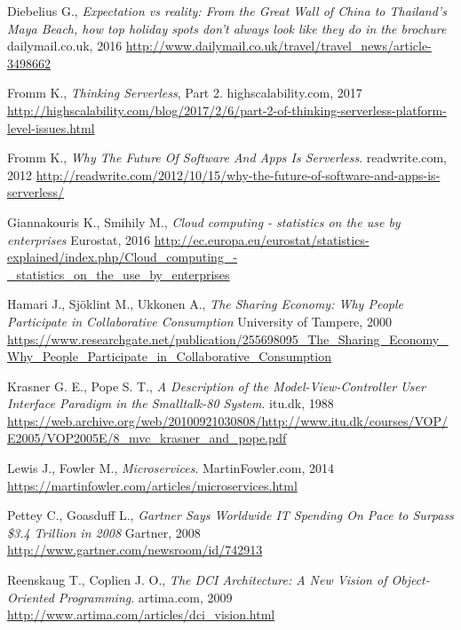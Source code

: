 \documentclass[oneside]{mgr}
\begin{document}
\begin{thebibliography}{99}

	Diebelius G., \emph{Expectation vs reality: From the Great Wall of China to Thailand's Maya Beach, how top holiday spots don't always look like they do in the brochure}
	dailymail.co.uk, 2016
	\url{http://www.dailymail.co.uk/travel/travel_news/article-3498662}

	Fromm K., \emph{Thinking Serverless}, Part 2.
	highscalability.com, 2017
	\url{http://highscalability.com/blog/2017/2/6/part-2-of-thinking-serverless-platform-level-issues.html}

	Fromm K., \emph{Why The Future Of Software And Apps Is Serverless}.
	readwrite.com, 2012
	\url{http://readwrite.com/2012/10/15/why-the-future-of-software-and-apps-is-serverless/}
	
	Giannakouris K., Smihily M., \emph{Cloud computing - statistics on the use by enterprises}
	Eurostat, 2016
	\url{http://ec.europa.eu/eurostat/statistics-explained/index.php/Cloud_computing_-_statistics_on_the_use_by_enterprises}

	Hamari J., Sjöklint M., Ukkonen A., \emph{The Sharing Economy: Why People Participate in Collaborative Consumption}
	University of Tampere, 2000
	\url{https://www.researchgate.net/publication/255698095_The_Sharing_Economy_Why_People_Participate_in_Collaborative_Consumption}
	
	Krasner G. E., Pope S. T., \emph{A Description of the Model-View-Controller User Interface Paradigm in the Smalltalk-80 System}.
	itu.dk, 1988
	\url{https://web.archive.org/web/20100921030808/http://www.itu.dk/courses/VOP/E2005/VOP2005E/8_mvc_krasner_and_pope.pdf}

	Lewis J., Fowler M., \emph{Microservices}.
	MartinFowler.com, 2014
	\url{https://martinfowler.com/articles/microservices.html}

	Pettey C., Goasduff L., \emph{Gartner Says Worldwide IT Spending On Pace to Surpass \$3.4 Trillion in 2008}
	Gartner, 2008
	\url{http://www.gartner.com/newsroom/id/742913}

	Reenskaug T., Coplien J. O., \emph{The DCI Architecture: A New Vision of Object-Oriented Programming}.
	artima.com, 2009
	\url{http://www.artima.com/articles/dci_vision.html}


\end{thebibliography}
\end{document}
